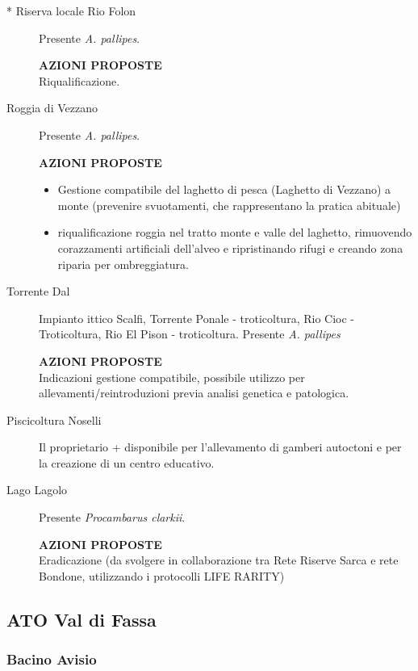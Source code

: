 \documentclass[11pt,a4paper,italian,twoside,openany]{memoir}
\begin{document}
\begin{description}
  \item[* Riserva locale Rio Folon] Presente \emph{A. pallipes}.

  \textbf{AZIONI PROPOSTE}\\

  Riqualificazione.

  \item[Roggia di Vezzano] Presente \emph{A. pallipes}.

  \textbf{AZIONI PROPOSTE}\\

  \begin{itemize}\itemsep0pt
    \item Gestione compatibile del laghetto di pesca (Laghetto di Vezzano) a monte (prevenire svuotamenti, che rappresentano la pratica abituale)
    \item riqualificazione roggia nel  tratto monte e valle del laghetto, rimuovendo corazzamenti artificiali dell’alveo e ripristinando rifugi e creando zona riparia per ombreggiatura.
  \end{itemize}

  \item[Torrente Dal] Impianto ittico Scalfi, Torrente Ponale - troticoltura, Rio Cioc - Troticoltura, Rio El Pison - troticoltura. Presente \emph{A. pallipes}

  \textbf{AZIONI PROPOSTE} \\

  Indicazioni gestione compatibile, possibile utilizzo per allevamenti/reintroduzioni previa analisi genetica e patologica.

  \item[Piscicoltura Noselli] Il proprietario + disponibile per l'allevamento di gamberi autoctoni e per la creazione di un centro educativo.

  \item[Lago Lagolo] Presente \emph{Procambarus clarkii}.

  \textbf{AZIONI PROPOSTE}\\

  Eradicazione (da svolgere in collaborazione tra Rete Riserve Sarca e rete Bondone, utilizzando i protocolli LIFE RARITY)
\end{description}
\subsection{ATO Val di Fassa}
\subsubsection{Bacino Avisio}
\end{document}
